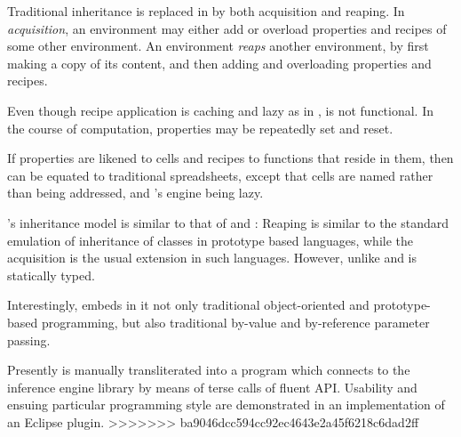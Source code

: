 Traditional inheritance is replaced in \Reap by both acquisition and reaping.
In \emph{acquisition}, an environment may either add or overload properties and
recipes of some other environment. An environment \emph{reaps} another
environment, by first making a copy of its content, and then adding and
overloading properties and recipes. 

Even though recipe application is caching and lazy as in
, \Reap is not functional. In the course of
computation, properties may be repeatedly set and reset.

If properties are likened to cells and recipes to functions that reside in them,
then \Reap can be equated to traditional spreadsheets, except that cells
   are named rather than being addressed, and \Reap's engine being lazy. 
   
\Reap's inheritance model is similar to that of  and
: Reaping is similar to the standard emulation of
inheritance of classes in prototype based languages, while the acquisition is the
usual extension in such languages.  However, unlike  and
 \Reap is statically typed.

Interestingly, \Reap embeds in it not only traditional object-oriented and
prototype-based programming, but also traditional by-value and by-reference
parameter passing.  

Presently \Reap is manually transliterated into a  program
which connects to the inference engine library by means of terse calls of
fluent API. Usability and ensuing particular programming style are demonstrated
in an implementation of an Eclipse plugin. 
>>>>>>> ba9046dcc594cc92ec4643e2a45f6218c6dad2ff
